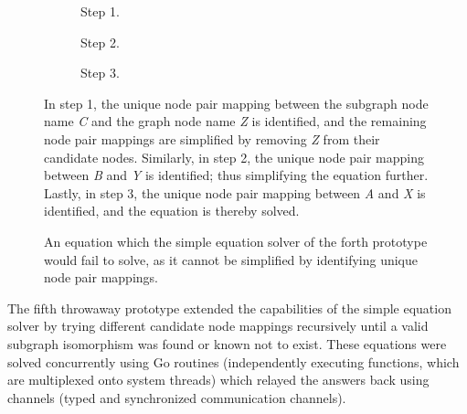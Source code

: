 \begin{figure}[htbp]
	\centering
	\begin{subfigure}[t]{0.30\textwidth}
		
		\caption{Step 1.}
	\end{subfigure}
	\enskip
	\begin{subfigure}[t]{0.23\textwidth}
		
		\caption{Step 2.}
	\end{subfigure}
	\enskip
	\begin{subfigure}[t]{0.17\textwidth}
		
		\caption{Step 3.}
	\end{subfigure}
	\caption{In step 1, the unique node pair mapping between the subgraph node name \textit{C} and the graph node name \textit{Z} is identified, and the remaining node pair mappings are simplified by removing \textit{Z} from their candidate nodes. Similarly, in step 2, the unique node pair mapping between \textit{B} and \textit{Y} is identified; thus simplifying the equation further. Lastly, in step 3, the unique node pair mapping between \textit{A} and \textit{X} is identified, and the equation is thereby solved.}
	\label{fig:equation_unique}
\end{figure}

\begin{figure}[htbp]
	\centering
	\begin{subfigure}[ht]{0.23\textwidth}
		
	\end{subfigure}
	\caption{An equation which the simple equation solver of the forth prototype would fail to solve, as it cannot be simplified by identifying unique node pair mappings.}
	\label{fig:equation_fail}
\end{figure}

The fifth throwaway prototype extended the capabilities of the simple equation solver by trying different candidate node mappings recursively until a valid subgraph isomorphism was found or known not to exist. These equations were solved concurrently using Go routines (independently executing functions, which are multiplexed onto system threads) which relayed the answers back using channels (typed and synchronized communication channels).

